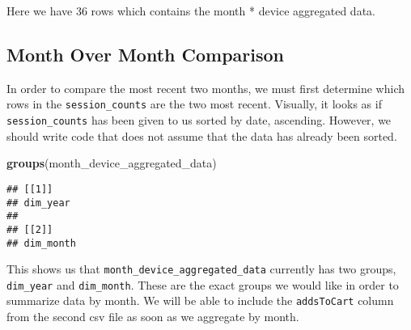 \documentclass[
]{article}
\newenvironment{Shaded}{\begin{snugshade}}{\end{snugshade}}
\newcommand{\FunctionTok}[1]{\textcolor[rgb]{0.13,0.29,0.53}{\textbf{#1}}}
\newcommand{\NormalTok}[1]{#1}
\begin{document}
Here we have 36 rows which contains the month * device aggregated data.

\hypertarget{month-over-month-comparison}{%
\subsection{Month Over Month
Comparison}\label{month-over-month-comparison}}

In order to compare the most recent two months, we must first determine
which rows in the \texttt{session\_counts} are the two most recent.
Visually, it looks as if \texttt{session\_counts} has been given to us
sorted by date, ascending. However, we should write code that does not
assume that the data has already been sorted.

\begin{Shaded}
\begin{Highlighting}[]
\FunctionTok{groups}\NormalTok{(month\_device\_aggregated\_data)}
\end{Highlighting}
\end{Shaded}

\begin{verbatim}
## [[1]]
## dim_year
## 
## [[2]]
## dim_month
\end{verbatim}

This shows us that \texttt{month\_device\_aggregated\_data} currently
has two groups, \texttt{dim\_year} and \texttt{dim\_month}. These are
the exact groups we would like in order to summarize data by month. We
will be able to include the \texttt{addsToCart} column from the second
csv file as soon as we aggregate by month.
\end{document}
